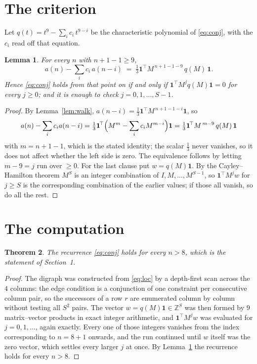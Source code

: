 \documentclass[11pt,a4paper]{article}
\theoremstyle{plain}
\newtheorem{theorem}{Theorem}
\newtheorem{lemma}[theorem]{Lemma}
\theoremstyle{definition}
\begin{document}
\section{The criterion}

Let $q(t)=t^{9}-\sum_i c_i\,t^{9-i}$ be the characteristic polynomial of
\eqref{eq:conj}, with the $c_i$ read off that equation.

\begin{lemma}\label{lem:crit}
For every $n$ with $n+1-1\ge9$,
\[
a(n)-\sum_i c_i\,a(n-i)\;=\;\tfrac1{3}\mathbf{1}^{\!\top}M^{\,n+1-1-9}\,q(M)\,\mathbf{1} .
\]
Hence \eqref{eq:conj} holds from that point on if and only if
$\mathbf{1}^{\!\top}M^{j}q(M)\mathbf{1}=0$ for every $j\ge0$; and it is enough to check
$j=0,1,\dots,S-1$.
\end{lemma}

\begin{proof}
By Lemma~\ref{lem:walk}, $a(n-i)=\tfrac1{3}\mathbf{1}^{\!\top}M^{\,n+1-1-i}\mathbf{1}$, so
\[
a(n)-\sum_i c_i a(n-i)
=\tfrac1{3}\mathbf{1}^{\!\top}\Bigl(M^{m}-\sum_i c_i M^{m-i}\Bigr)\mathbf{1}
=\tfrac1{3}\mathbf{1}^{\!\top}M^{\,m-9}\,q(M)\,\mathbf{1}
\]
with $m=n+1-1$, which is the stated identity; the scalar $\tfrac1{3}$ never vanishes, so
it does not affect whether the left side is zero. The equivalence follows by letting
$m-9=j$ run over $\ge0$. For the last clause put $w=q(M)\mathbf{1}$. By the
Cayley--Hamilton theorem $M^{S}$ is an integer combination of $I,M,\dots,M^{S-1}$, so
$\mathbf{1}^{\!\top}M^{j}w$ for $j\ge S$ is the corresponding combination of the earlier
values; if those all vanish, so do all the rest.
\end{proof}

\section{The computation}

\begin{theorem}
The recurrence \eqref{eq:conj} holds for every $n>8$, which is the statement of
Section~1.
\end{theorem}

\begin{proof}
The digraph was constructed from \eqref{eq:loc} by a depth-first scan across the $4$
columns: the edge condition is a conjunction of one constraint per consecutive column
pair, so the successors of a row $r$ are enumerated column by column without testing all
$S^2$ pairs. The vector $w=q(M)\mathbf{1}\in\mathbb{Z}^{S}$ was then formed by $9$
matrix--vector products in exact integer arithmetic, and $\mathbf{1}^{\!\top}M^{j}w$ was
evaluated for $j=0,1,\dots$, again exactly. Every one of those integers vanishes from the
index corresponding to $n=8+1$ onwards, and the run continued until $w$ itself was the
zero vector, which settles every larger $j$ at once. By Lemma~\ref{lem:crit} the recurrence
holds for every $n>8$.
\end{proof}
\end{document}
